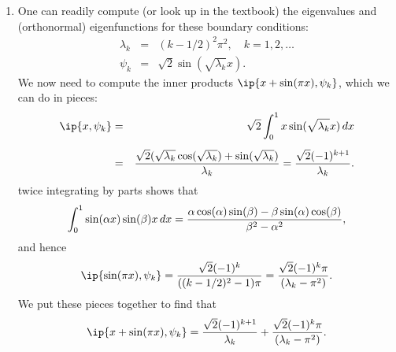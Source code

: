 {\begin{solution}
\begin{enumerate}
 \item One can readily compute (or look up in the textbook) 
      the eigenvalues and (orthonormal) eigenfunctions for these boundary conditions:
     \begin{eqnarray*} \lambda_k &=& (k-1/2)^2 \pi^2, \quad k = 1, 2, \ldots \\[0.5em]
                        \psi_k &=& \sqrt{2} \sin(\sqrt{\lambda_k} x).
      \end{eqnarray*}
     We now need to compute the inner products $\ip{x+\sin(\pi x), \psi_k}$, which we can do
     in pieces:
     \begin{eqnarray*} 
          \ip{x, \psi_k} &=& \sqrt{2} \int_0^1 x \sin(\sqrt{\lambda_k} x) \, dx  \\[0.5em]
                      &=& {\sqrt{2}(\sqrt{\lambda_k}\cos(\sqrt{\lambda_k})+\sin(\sqrt{\lambda_k})
                               \over \lambda_k}
                      = {\sqrt{2}(-1)^{k+1} \over \lambda_k}.
     \end{eqnarray*}
     twice integrating by parts shows that
       \[ \int_0^1 \sin(\alpha x) \sin(\beta)x\, dx
             = {\alpha \cos(\alpha)\sin(\beta) - \beta\sin(\alpha)\cos(\beta) 
                    \over \beta^2-\alpha^2},\]
     and hence
       \[   \ip{\sin(\pi x), \psi_k} = {\sqrt{2} (-1)^k \over ((k-1/2)^2-1)\pi}
                                  = {\sqrt{2} (-1)^k \pi\over (\lambda_k - \pi^2)}.\]
     We put these pieces together to find that
       \[   \ip{x+\sin(\pi x), \psi_k} = 
                  {\sqrt{2}(-1)^{k+1} \over \lambda_k}
                + {\sqrt{2} (-1)^k \pi\over (\lambda_k - \pi^2)}.\]


\end{enumerate}
\end{solution}}
